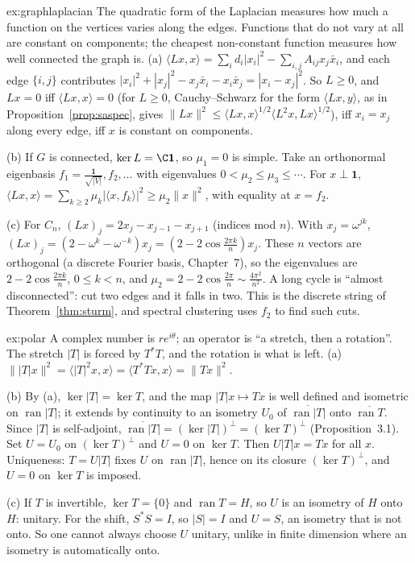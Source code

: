 \begin{solution}{ex:graphlaplacian}
\idea The quadratic form of the Laplacian measures how much a function on the vertices varies along the edges. Functions that do not vary at all are constant on components; the cheapest non-constant function
measures how well connected the graph is.
\writeup (a) $\langle Lx,x\rangle=\sum_id_i|x_i|^2-\sum_{i,j}A_{ij}x_j\bar x_i$, and each edge $\{i,j\}$ contributes $|x_i|^2+|x_j|^2-x_j\bar x_i-x_i\bar x_j=|x_i-x_j|^2$. So $L\ge0$, and $Lx=0$ iff $\langle Lx,x\rangle=0$ (for $L\ge0$,
Cauchy--Schwarz for the form $\langle Lx,y\rangle$, as in Proposition~\ref{prop:saspec}, gives $\|Lx\|^2\le\langle Lx,x\rangle^{1/2}\langle L^2x,Lx\rangle^{1/2}$), iff $x_i=x_j$ along every edge, iff $x$ is constant on components.

(b) If $G$ is connected, $\ker L=\C\mathbf 1$, so $\mu_1=0$ is simple. Take an orthonormal eigenbasis $f_1=\frac{\mathbf 1}{\sqrt{|V|}},f_2,\dots$ with eigenvalues $0<\mu_2\le\mu_3\le\cdots$. For $x\perp\mathbf 1$,
$\langle Lx,x\rangle=\sum_{k\ge2}\mu_k|\langle x,f_k\rangle|^2\ge\mu_2\|x\|^2$, with equality at $x=f_2$.

(c) For $C_n$, $(Lx)_j=2x_j-x_{j-1}-x_{j+1}$ (indices mod $n$). With $x_j=\omega^{jk}$, $(Lx)_j=(2-\omega^k-\omega^{-k})x_j=(2-2\cos\frac{2\pi k}n)x_j$. These $n$ vectors are orthogonal (a discrete Fourier basis, Chapter~7), so the
eigenvalues are $2-2\cos\frac{2\pi k}n$, $0\le k<n$, and $\mu_2=2-2\cos\frac{2\pi}n\sim\frac{4\pi^2}{n^2}$. A long cycle is ``almost disconnected'': cut two edges and it falls in two. This is the discrete string of
Theorem~\ref{thm:sturm}, and spectral clustering uses $f_2$ to find such cuts.
\end{solution}

\begin{solution}{ex:polar}
\idea A complex number is $re^{i\theta}$; an operator is ``a stretch, then a rotation''. The stretch $|T|$ is forced by $T^*T$, and the rotation is what is left.
\writeup (a) $\||T|x\|^2=\langle|T|^2x,x\rangle=\langle T^*Tx,x\rangle=\|Tx\|^2$.

(b) By (a), $\ker|T|=\ker T$, and the map $|T|x\mapsto Tx$ is well defined and isometric on $\operatorname{ran}|T|$; it extends by continuity to an isometry $U_0$ of $\overline{\operatorname{ran}|T|}$ onto $\overline{\operatorname{ran}T}$.
Since $|T|$ is self-adjoint, $\overline{\operatorname{ran}|T|}=(\ker|T|)^\perp=(\ker T)^\perp$ (Proposition~3.1). Set $U=U_0$ on $(\ker T)^\perp$ and $U=0$ on $\ker T$. Then $U|T|x=Tx$ for all $x$. Uniqueness: $T=U|T|$ fixes $U$ on
$\operatorname{ran}|T|$, hence on its closure $(\ker T)^\perp$, and $U=0$ on $\ker T$ is imposed.

(c) If $T$ is invertible, $\ker T=\{0\}$ and $\operatorname{ran}T=H$, so $U$ is an isometry of $H$ onto $H$: unitary. For the shift, $S^*S=I$, so $|S|=I$ and $U=S$, an isometry that is not onto. So one cannot always choose
$U$ unitary, unlike in finite dimension where an isometry is automatically onto.
\end{solution}

